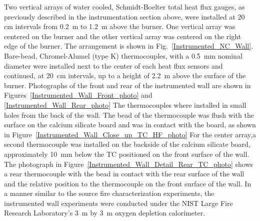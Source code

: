 \documentclass[twoside]{uocthesis}
\begin{document}
{Two vertical arrays of water cooled, Schmidt-Boelter total heat flux gauges, as previously described in the instrumentation section above, were installed at 20 cm intervals from 0.2~m to 1.2~m above the burner.  One vertical array was centered on the burner and the other vertical array was centered on the right edge of the burner. The arrangement is shown in Fig.~\ref{Instrumented_NC_Wall}. Bare-bead, Chromel-Alumel (type K) thermocouples, with a 0.5~mm nominal diameter were installed next to the center of each heat flux sensors and continued, at 20~cm intervals, up to a height of 2.2~m above the surface of the burner. Photographs of the front and rear of the instrumented wall are shown in Figures~\ref{Instrumented_Wall_Front_photo} and \ref{Instrumented_Wall_Rear_photo} The thermocouples where installed in small holes from the back of the wall.  The bead of the thermocouple was flush with the surface on the calcium silicate board and was in contact with the board, as shown in Figure~\ref{Instrumented_Wall_Close_up_TC_HF_photo} For the center array,a second thermocouple was installed on the backside of the calcium silicate board, approximately 10~mm below the TC positioned on the front surface of the wall. The photograph in Figure~\ref{Instrumented_Wall_Detail_Rear_TC_photo} shows a rear thermocouple with the bead in contact with the rear surface of the wall and the relative position to the thermocouple on the front surface of the wall. In a manner similar to the source fire characterization experiments, the instrumented wall experiments were conducted under the NIST Large Fire Research Laboratory's 3~m by 3~m oxygen depletion calorimeter.

}
\end{document}
